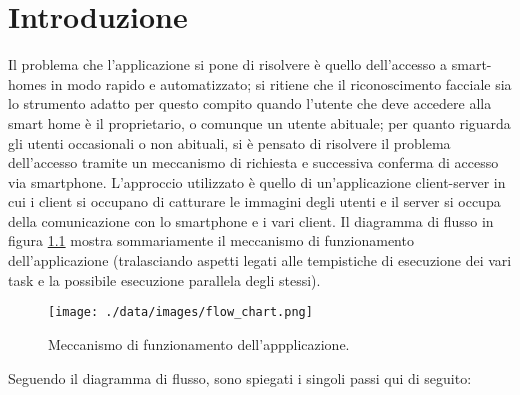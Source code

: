\chapter{Introduzione}

Il problema che l'applicazione si pone di risolvere è quello dell'accesso a smart-homes in modo rapido e automatizzato; si ritiene che il riconoscimento facciale sia lo strumento adatto per questo compito quando l'utente che deve accedere alla smart home è il proprietario, o comunque un utente abituale; per quanto riguarda gli utenti occasionali o non abituali, si è pensato di risolvere il problema dell'accesso tramite un meccanismo di richiesta e successiva conferma di accesso via smartphone. L'approccio utilizzato è quello di un'applicazione client-server in cui i client si occupano di catturare le immagini degli utenti e il server si occupa della comunicazione con lo smartphone e i vari client. Il diagramma di flusso in figura \ref{flow_chart} mostra sommariamente il meccanismo di funzionamento dell'applicazione (tralasciando aspetti legati alle tempistiche di esecuzione dei vari task e la possibile esecuzione parallela degli stessi).
\begin{figure}
	\centering
	\texttt{[image: ./data/images/flow\_chart.png]}
	\caption{Meccanismo di funzionamento dell'appplicazione.}
	\label{flow_chart}
\end{figure}
Seguendo il diagramma di flusso, sono spiegati i singoli passi qui di seguito:
